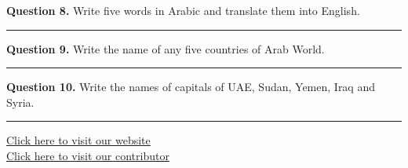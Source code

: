 \documentclass[11pt,a4paper]{article}
\begin{document}
\noindent   \textbf{Question 8.} Write five words in Arabic and translate them into English.

\medskip\rule{\linewidth}{0.2pt}\medskip




\noindent   \textbf{Question 9.} Write the name of any five countries of Arab World.

\medskip\rule{\linewidth}{0.2pt}\medskip




\noindent   \textbf{Question 10.} Write the names of capitals of UAE, Sudan, Yemen, Iraq and Syria.

\vfill
\rule{\linewidth}{0.4pt}

\begin{center}\small
\href{https://bhu-exam.vercel.app/}{Click here to visit our website}\\[4pt]
\href{https://me-aryan.vercel.app/}{Click here to visit our contributor}
\end{center}
\end{document}
